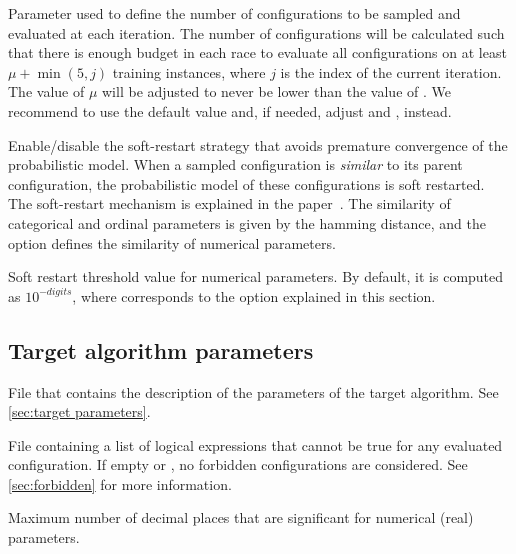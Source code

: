 \begin{description}
  Parameter used to define the number of configurations to be sampled and evaluated at each iteration. The number of configurations will be calculated such that there is enough budget in each race to evaluate all configurations on at least $\mu + \min(5,j)$ training instances, where $j$ is the index of the current iteration. The value of $\mu$ will be adjusted to never be lower than the value of . We recommend to use the default value and, if needed, adjust and , instead.

  Enable/disable the soft-restart strategy that avoids premature convergence of the probabilistic model. When a sampled configuration is \emph{similar} to its parent configuration, the probabilistic model of these configurations is soft restarted. The soft-restart mechanism is explained in the \irace paper~\citep{LopDubPerStuBir2016irace}. The similarity of categorical and ordinal parameters is given by the hamming distance, and the option  defines the similarity of numerical parameters.

Soft restart threshold value for numerical parameters. By default, it is computed as $10^{-digits}$, where  corresponds to the \irace option explained in this section.

\end{description}

\subsection[Target algorithm parameters]{Target algorithm parameters}
\begin{description}
File that contains the description of the parameters of the target algorithm. See \autoref{sec:target parameters}.

File containing a list of logical expressions that cannot be true for any evaluated configuration. If empty or , no forbidden configurations are considered. See \autoref{sec:forbidden} for more information.

Maximum number of decimal places that are significant for numerical (real) parameters.

\end{description}

